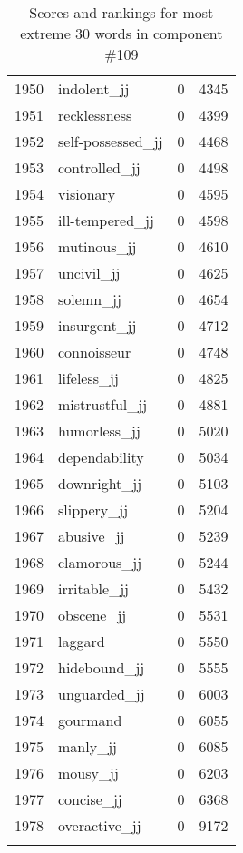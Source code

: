 \begin{longtable}[!htbp]{| rlr@{.}l |}
    1950 & indolent\_jj & 0 & 4345 \\
    1951 & recklessness & 0 & 4399 \\
    1952 & self-possessed\_jj & 0 & 4468 \\
    1953 & controlled\_jj & 0 & 4498 \\
    1954 & visionary & 0 & 4595 \\
    1955 & ill-tempered\_jj & 0 & 4598 \\
    1956 & mutinous\_jj & 0 & 4610 \\
    1957 & uncivil\_jj & 0 & 4625 \\
    1958 & solemn\_jj & 0 & 4654 \\
    1959 & insurgent\_jj & 0 & 4712 \\
    1960 & connoisseur & 0 & 4748 \\
    1961 & lifeless\_jj & 0 & 4825 \\
    1962 & mistrustful\_jj & 0 & 4881 \\
    1963 & humorless\_jj & 0 & 5020 \\
    1964 & dependability & 0 & 5034 \\
    1965 & downright\_jj & 0 & 5103 \\
    1966 & slippery\_jj & 0 & 5204 \\
    1967 & abusive\_jj & 0 & 5239 \\
    1968 & clamorous\_jj & 0 & 5244 \\
    1969 & irritable\_jj & 0 & 5432 \\
    1970 & obscene\_jj & 0 & 5531 \\
    1971 & laggard & 0 & 5550 \\
    1972 & hidebound\_jj & 0 & 5555 \\
    1973 & unguarded\_jj & 0 & 6003 \\
    1974 & gourmand & 0 & 6055 \\
    1975 & manly\_jj & 0 & 6085 \\
    1976 & mousy\_jj & 0 & 6203 \\
    1977 & concise\_jj & 0 & 6368 \\
    1978 & overactive\_jj & 0 & 9172 \\
    \hline
    \caption{Scores and rankings for most extreme 30 words in component \#109} \\
\end{longtable}
